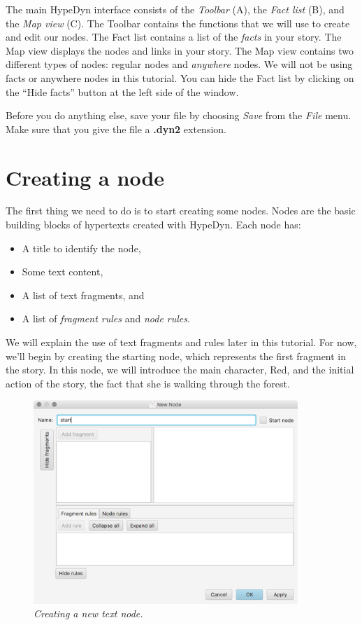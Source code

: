 \documentclass{article}
\begin{document}
The main HypeDyn interface consists of the \textit{Toolbar} (A), the \textit{Fact list} (B), and the \textit{Map view} (C). The Toolbar contains the functions that we will use to create and edit our nodes. The Fact list contains a list of the \textit{facts} in your story. The Map view displays the nodes and links in your story. The Map view contains two different types of nodes: regular nodes and \textit{anywhere} nodes. We will not be using facts or anywhere nodes in this tutorial. You can hide the Fact list by clicking on the ``Hide facts'' button at the left side of the window.

Before you do anything else, save your file by choosing \textit{Save} from the \textit{File} menu. Make sure that you give the file a \textbf{.dyn2} extension.

\section{Creating a node}

The first thing we need to do is to start creating some nodes. Nodes are the basic building blocks of hypertexts created with HypeDyn.
Each node has: 
\begin{itemize}
  \item A title to identify the node,
  \item Some text content,
  \item A list of text fragments, and
  \item A list of \textit{fragment rules} and \textit{node rules}.
\end{itemize}

We will explain the use of text fragments and rules later in this tutorial. For now, we'll begin by creating the starting node, which represents the first fragment in the story. In this node, we will introduce the main character, Red, and the initial action of the story, the fact that she is walking through the forest.
 
\begin{figure}[ht]
  \centering
  \includegraphics[width=10cm]{images/hypedyn-tutorial-1-figure-3}
  \caption{\textit{Creating a new text node.}}
  \label{fig:tut1:new_node}
\end{figure} 
\end{document}
